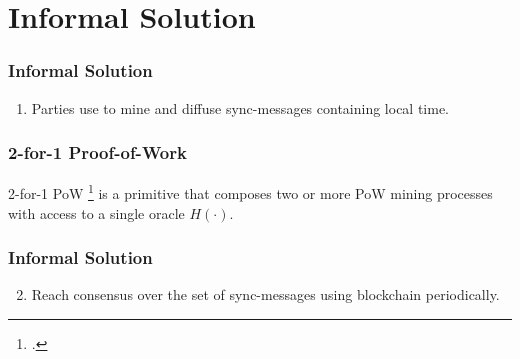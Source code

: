 \section{Informal Solution}

\begin{frame}
    \frametitle{Informal Solution} \centering

    

    \begin{enumerate}
        \item Parties use  to mine and diffuse sync-messages containing local time.
    \end{enumerate}
\end{frame}

\begin{frame}
    \frametitle{2-for-1 Proof-of-Work}

    2-for-1 PoW \cite[Eurocrypt '15]{GKL15}\footcite{GKL15} is a primitive that composes two or more PoW mining processes with access to a single oracle $H(\cdot)$.


\end{frame}

\begin{frame}
    \frametitle{Informal Solution} \centering

    

    \begin{enumerate} \setcounter{enumi}{1}
        \item Reach consensus over the set of sync-messages using blockchain periodically.
    \end{enumerate}
\end{frame}


